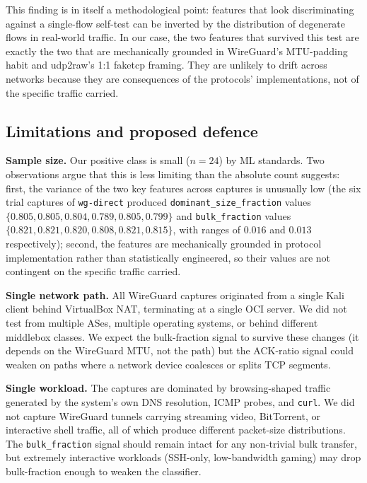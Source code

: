 \documentclass[conference]{IEEEtran}
\begin{document}
This finding is in itself a methodological point: features that look
discriminating against a single-flow self-test can be inverted by the
distribution of degenerate flows in real-world traffic. In our case, the
two features that survived this test are exactly the two that are
mechanically grounded in WireGuard's MTU-padding habit and udp2raw's
1:1 faketcp framing. They are unlikely to drift across networks because
they are consequences of the protocols' implementations, not of the
specific traffic carried.

\subsection{Limitations and proposed defence}

\textbf{Sample size.} Our positive class is small ($n=24$) by ML
standards. Two observations argue that this is less limiting than the
absolute count suggests: first, the variance of the two key features
across captures is unusually low (the six trial captures of
\texttt{wg-direct} produced \texttt{dominant\_size\_fraction} values
$\{0.805, 0.805, 0.804, 0.789, 0.805, 0.799\}$ and
\texttt{bulk\_fraction} values $\{0.821, 0.821, 0.820, 0.808, 0.821,
0.815\}$, with ranges of $0.016$ and $0.013$ respectively); second,
the features are mechanically grounded in protocol implementation
rather than statistically engineered, so their values are not
contingent on the specific traffic carried.

\textbf{Single network path.} All WireGuard captures originated from a
single Kali client behind VirtualBox NAT, terminating at a single OCI
server. We did not test from multiple ASes, multiple operating systems,
or behind different middlebox classes. We expect the bulk-fraction
signal to survive these changes (it depends on the WireGuard MTU, not
the path) but the ACK-ratio signal could weaken on paths where a
network device coalesces or splits TCP segments.

\textbf{Single workload.} The captures are dominated by browsing-shaped
traffic generated by the system's own DNS resolution, ICMP probes, and
\texttt{curl}. We did not capture WireGuard tunnels carrying
streaming video, BitTorrent, or interactive shell traffic, all of
which produce different packet-size distributions. The
\texttt{bulk\_fraction} signal should remain intact for any
non-trivial bulk transfer, but extremely interactive workloads
(SSH-only, low-bandwidth gaming) may drop bulk-fraction enough to
weaken the classifier.
\end{document}
